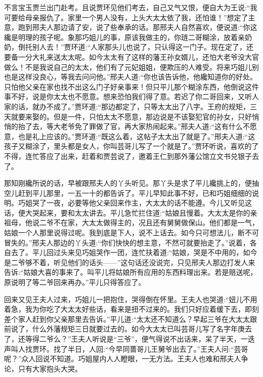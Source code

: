 \begin{parag}
    不言宝玉贾兰出门赴考。且说贾环见他们考去，自己又气又恨，便自大为王说:“我可要给母亲报仇了。家里一个男人没有，上头大太太依了我，还怕谁！”想定了主意，跑到邢夫人那边请了安，说了些奉承的话。那邢夫人自然喜欢，便说道:“你这纔是明理的孩子呢。象那巧姐儿的事，原该我做主的，你琏二哥糊涂，放着亲奶奶，倒托别人去！”贾环道:“人家那头儿也说了，只认得这一门子。现在定了，还要备一分大礼来送太太呢。如今太太有了这样的藩王孙女婿儿，还怕大老爷没大官做么！不是我说自己的太太，他们有了元妃姐姐，便欺压的人难受。将来巧姐儿别也是这样没良心，等我去问问他。”邢夫人道:“你也该告诉他，他纔知道你的好处。只怕他父亲在家也找不出这么门子好亲事来！但只平儿那个糊涂东西，他倒说这件事不好，说是你太太也不愿意。想来恐怕我们得了意。若迟了你二哥回来，又听人家的话，就办不成了。”贾环道:“那边都定了，只等太太出了八字。王府的规矩，三天就要来娶的。但是一件，只怕太太不愿意，那边说是不该娶犯官的孙女，只好悄悄的抬了去，等大老爷免了罪做了官，再大家热闹起来。”邢夫人道:“这有什么不愿意，也是礼上应该的。”贾环道:“既这么着，这帖子太太出了就是了。”邢夫人道:“这孩子又糊涂了，里头都是女人，你叫芸哥儿写了一个就是了。”贾环听说，喜欢的了不得，连忙答应了出来，赶着和贾芸说了，邀着王仁到那外藩公馆立文书兑银子去了。
\end{parag}


\begin{parag}
    那知刚纔所说的话，早被跟邢夫人的丫头听见。那丫头是求了平儿纔挑上的，便抽空儿赶到平儿那里，一五一十的都告诉了。平儿早知此事不好，已和巧姐细细的说明。巧姐哭了一夜，必要等他父亲回来作主，大太太的话不能遵。今儿又听见这话，便大哭起来，要和太太讲去。平儿急忙拦住道:“姑娘且慢着。大太太是你的亲祖母，他说二爷不在家，大太太做得主的，况且还有舅舅做保山。他们都是一气，姑娘一个人那里说得过呢。我到底是下人，说不上话去。如今只可想法儿，断不可冒失的。”邢夫人那边的丫头道:“你们快快的想主意，不然可就要抬走了。”说着，各自去了。平儿回过头来见巧姐哭作一团，连忙扶着道:“姑娘，哭是不中用的，如今是二爷够不着，听见他们的话头——”这句话还没说完，只见邢夫人那边打发人来告诉:“姑娘大喜的事来了。叫平儿将姑娘所有应用的东西料理出来。若是赔送呢，原说明了等二爷回来再办。”平儿只得答应了。
\end{parag}


\begin{parag}
    回来又见王夫人过来，巧姐儿一把抱住，哭得倒在怀里。王夫人也哭道:“妞儿不用着急，我为你吃了大太太好些话，看来是扭不过来的。我们只好应着缓下去，即刻差个家人赶到你父亲那里去告诉。”平儿道:“太太还不知道么？早起三爷在大太太跟前说了，什么外藩规矩三日就要过去的。如今大太太已叫芸哥儿写了名字年庚去了，还等得二爷么？”王夫人听说是“三爷”，便气得说不出话来，呆了半天，一迭声叫人找贾环。找了半日，人回:“今早同蔷哥儿王舅爷出去了。”王夫人问:“芸哥呢？”众人回说不知道。巧姐屋内人人瞪眼，一无方法。王夫人也难和邢夫人争论，只有大家抱头大哭。
\end{parag}


